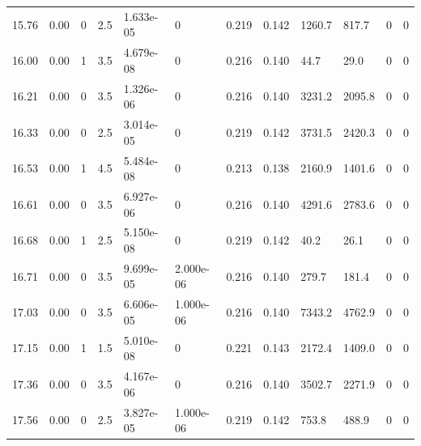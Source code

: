\documentclass[preview]{standalone}
\begin{document}
{{{\begin{tabular}{L{1.2cm}C{1.2cm} C{0.3cm}C{0.5cm} C{1.4cm}C{1.4cm} C{1.4cm}C{1.4cm} C{1.6cm}C{1.6cm} C{1.6cm}C{1.6cm}}
  15.76  &  0.00  & 0     & 2.5 &  1.633e-05  & 0  &  0.219&   0.142& 1260.7 & 817.7   &  0 & 0  \\ 
  16.00  &  0.00  & 1     & 3.5 &  4.679e-08  & 0  &  0.216&   0.140& 44.7 & 29.0   &  0 & 0  \\ 
  16.21  &  0.00  & 0     & 3.5 &  1.326e-06  & 0  &  0.216&   0.140& 3231.2 & 2095.8   &  0 & 0  \\ 
  16.33  &  0.00  & 0     & 2.5 &  3.014e-05  & 0  &  0.219&   0.142& 3731.5 & 2420.3   &  0 & 0  \\ 
  16.53  &  0.00  & 1     & 4.5 &  5.484e-08  & 0  &  0.213&   0.138& 2160.9 & 1401.6   &  0 & 0  \\ 
  16.61  &  0.00  & 0     & 3.5 &  6.927e-06  & 0  &  0.216&   0.140& 4291.6 & 2783.6   &  0 & 0  \\ 
  16.68  &  0.00  & 1     & 2.5 &  5.150e-08  & 0  &  0.219&   0.142& 40.2 & 26.1   &  0 & 0  \\ 
  16.71  &  0.00  & 0     & 3.5 &  9.699e-05  & 2.000e-06  &  0.216&   0.140& 279.7 & 181.4   &  0 & 0  \\ 
  17.03  &  0.00  & 0     & 3.5 &  6.606e-05  & 1.000e-06  &  0.216&   0.140& 7343.2 & 4762.9   &  0 & 0  \\ 
  17.15  &  0.00  & 1     & 1.5 &  5.010e-08  & 0  &  0.221&   0.143& 2172.4 & 1409.0   &  0 & 0  \\ 
  17.36  &  0.00  & 0     & 3.5 &  4.167e-06  & 0  &  0.216&   0.140& 3502.7 & 2271.9   &  0 & 0  \\ 
  17.56  &  0.00  & 0     & 2.5 &  3.827e-05  & 1.000e-06  &  0.219&   0.142& 753.8 & 488.9   &  0 & 0  \\ 
\hline 
\end{tabular} 

}}}
\end{document}

